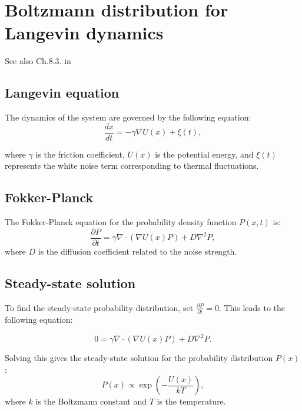 \documentclass{article}
\theoremstyle{definition} \newtheorem{definition}{Definition}
\theoremstyle{remark} \newtheorem{remark}{Remark}
\newcounter{ct}
\begin{document}
\newpage




\newpage
\appendix

\section{Boltzmann distribution for Langevin dynamics}
See also Ch.8.3. in \citep{villani2021topics}
\subsection{Langevin equation}
The dynamics of the system are governed by the following equation:
\begin{equation}
    \frac{dx}{dt} = - \gamma \nabla U(x) + \xi(t),
\end{equation}

where $\gamma$ is the friction coefficient, $U(x)$ is the potential energy, and $\xi(t)$ represents the white noise term corresponding to thermal fluctuations.

\subsection{Fokker-Planck}
The Fokker-Planck equation for the probability density function $P(x,t)$ is:
\begin{equation}
    \frac{\partial P}{\partial t} = \gamma \nabla \cdot \left( \nabla U(x) P \right) + D \nabla^2 P,
\end{equation}
where $D$ is the diffusion coefficient related to the noise strength.

\subsection{Steady-state solution}
To find the steady-state probability distribution, set $\frac{\partial P}{\partial t} = 0$. This leads to the following equation:

\begin{equation}
    0 = \gamma \nabla \cdot \left( \nabla U(x) P \right) + D \nabla^2 P.
\end{equation}

Solving this gives the steady-state solution for the probability distribution $P(x)$:
\begin{equation}
    P(x) \propto \exp \left( - \frac{U(x)}{kT} \right),
\end{equation}
where $k$ is the Boltzmann constant and $T$ is the temperature.
\end{document}
